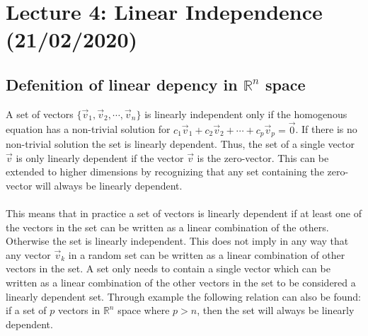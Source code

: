\documentclass[11pt, a4paper]{article}
\begin{document}
\setcounter{section}{3}
\section{Lecture 4: Linear Independence (21/02/2020)}
\subsection{Defenition of linear depency in $\mathbb{R}^n$ space}
A set of vectors $\{ \vec{v}_1 , \vec{v}_2, \cdots, \vec{v}_n \}$ is linearly independent only
if the homogenous equation has a non-trivial solution for $c_1\vec{v}_1 + c_2\vec{v}_2 + \cdots + c_p\vec{v}_p = \vec{0}$.
If there is no non-trivial solution the set is linearly dependent. Thus, the set of a single vector
$\vec{v}$ is only linearly dependent if the vector $\vec{v}$ is the zero-vector. This can be extended
to higher dimensions by recognizing that any set containing the zero-vector will always be linearly dependent.\\
\\
This means that in practice a set of vectors is linearly dependent if at least one of the vectors
in the set can be written as a linear combination of the others. Otherwise the set is linearly independent.
This does not imply in any way that any vector $\vec{v}_k$ in a random set can be written as a linear combination
of other vectors in the set. A set only needs to contain a single vector which can be written as a linear combination
of the other vectors in the set to be considered a linearly dependent set.
Through example the following relation can also be found: if a set of $p$ vectors in $\mathbb{R}^n$ space
where $p > n$, then the set will always be linearly dependent.
\end{document}
